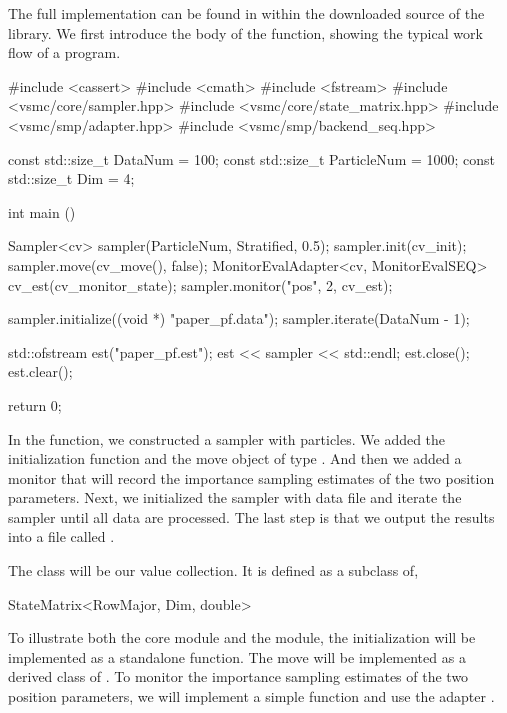 \documentclass[11pt, bib, hyper, mint, minted=cache]{marticle}
\begin{document}
The full implementation can be found in
 within the downloaded source of
the library. We first introduce the body of the  function,
showing the typical work flow of a \vsmc program.
\begin{cppcode}
#include <cassert>
#include <cmath>
#include <fstream>
#include <vsmc/core/sampler.hpp>
#include <vsmc/core/state_matrix.hpp>
#include <vsmc/smp/adapter.hpp>
#include <vsmc/smp/backend_seq.hpp>

const std::size_t DataNum = 100;
const std::size_t ParticleNum = 1000;
const std::size_t Dim = 4;

int main ()
{
    Sampler<cv> sampler(ParticleNum, Stratified, 0.5);
    sampler.init(cv_init);
    sampler.move(cv_move(), false);
    MonitorEvalAdapter<cv, MonitorEvalSEQ> cv_est(cv_monitor_state);
    sampler.monitor("pos", 2, cv_est);

    sampler.initialize((void *) "paper_pf.data");
    sampler.iterate(DataNum - 1);

    std::ofstream est("paper_pf.est");
    est << sampler << std::endl;
    est.close();
    est.clear();

    return 0;
}
\end{cppcode}
In the  function, we constructed a sampler with
 particles. We added the initialization function
 and the move object of type . And then
we added a monitor that will record the importance sampling estimates of the
two position parameters. Next, we initialized the sampler with data file
 and iterate the sampler until all data are
processed. The last step is that we output the results into a file called
.

The class  will be our value collection. It is defined as a
subclass of,
\begin{cppcode}
StateMatrix<RowMajor, Dim, double>
\end{cppcode}
To illustrate both the core module and the \smp module, the initialization
 will be implemented as a standalone function. The move
 will be implemented as a derived class of
. To monitor the importance sampling estimates of the
two position parameters, we will implement a simple function
 and use the adapter
.
\end{document}
